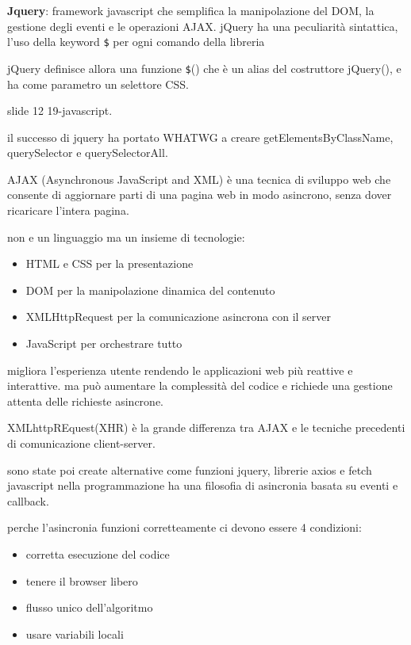 \documentclass[12pt]{article}
\begin{document}
    \textbf{Jquery}: framework javascript che semplifica la manipolazione del DOM, la gestione degli eventi e le operazioni AJAX.
jQuery ha una peculiarità sintattica, l'uso della keyword \texttt{\$} per
ogni comando della libreria

jQuery definisce allora una funzione \texttt{\$}() che è un alias del
costruttore jQuery(), e ha come parametro un selettore CSS.

slide 12 19-javascript.

il successo di jquery ha portato WHATWG a creare getElementsByClassName, querySelector e querySelectorAll.

AJAX (Asynchronous JavaScript and XML) è una tecnica di sviluppo web che consente di aggiornare parti di una pagina web in modo asincrono, senza dover ricaricare l'intera pagina.

non e un linguaggio ma un insieme di tecnologie:
\begin{itemize}
    \item HTML e CSS per la presentazione
    \item DOM per la manipolazione dinamica del contenuto
    \item XMLHttpRequest per la comunicazione asincrona con il server
    \item JavaScript per orchestrare tutto
    \end{itemize}

    migliora l'esperienza utente rendendo le applicazioni web più reattive e interattive. ma può aumentare la complessità del codice e richiede una gestione attenta delle richieste asincrone.

XMLhttpREquest(XHR) è la grande differenza tra AJAX e le tecniche precedenti di comunicazione client-server.

sono state poi create alternative come funzioni jquery, librerie axios e fetch\\

javascript nella programmazione ha una filosofia di asincronia basata su eventi e callback.

perche l'asincronia funzioni corretteamente ci devono essere 4 condizioni:
\begin{itemize}
\item corretta esecuzione del codice
\item tenere il browser libero
\item flusso unico dell'algoritmo
\item usare variabili locali
\end{itemize}
\end{document}

